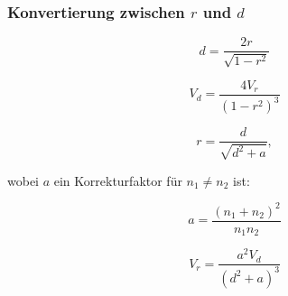 \begin{frame}
  \frametitle{Konvertierung zwischen $r$ und $d$}

  \begin{equation}
    d = \frac{2r}{\sqrt{1-r^2}}
  \end{equation}
  
  \begin{equation}
    V_d = \frac{4V_r}{(1-r^2)^3}
  \end{equation}
  
  \begin{equation}
    r = \frac{d}{\sqrt{d^2+a}},
  \end{equation}
  
  wobei $a$ ein Korrekturfaktor für $n_1 \neq n_2$ ist:
  
  \begin{equation}
    a = \frac{(n_1+n_2)^2}{n_1n_2}
  \end{equation}
  
  \begin{equation}
    V_r = \frac{a^2V_d}{(d^2+a)^3}
  \end{equation}

  \citep[46ff]{borenstein_introduction_2009}
  
\end{frame}

  



